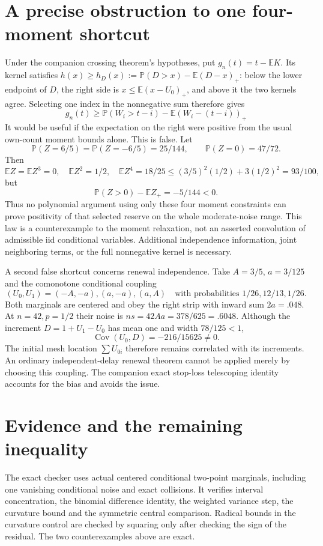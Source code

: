 \documentclass[11pt,a4paper]{article}
\newcommand{\E}{\mathbb E}\newcommand{\Pp}{\mathbb P}
\begin{document}
\section{A precise obstruction to one four-moment shortcut}
Under the companion crossing theorem's hypotheses, put
$g_n(t)=t-\E K$. Its kernel satisfies
$h(x)\ge h_D(x):=\Pp(D>x)-\E(D-x)_+$: below the lower endpoint of
$D$, the right side is $x\le\E(x-U_0)_+$, and above it the two
kernels agree. Selecting one index in the nonnegative sum therefore gives
\[
 g_n(t)\ge\Pp(W_i>t-i)-\E(W_i-(t-i))_+
\]
It would be useful if the expectation on the right
were positive from the usual own-count moment bounds alone. This is false.
Let
\[
 \Pp(Z=6/5)=\Pp(Z=-6/5)=25/144,
                 \qquad\Pp(Z=0)=47/72.
\]
Then
\[
 \E Z=\E Z^3=0,\quad \E Z^2=1/2,\quad\E Z^4=18/25
       \le(3/5)^2(1/2)+3(1/2)^2=93/100,
\]
but
\[
                   \Pp(Z>0)-\E Z_+=-5/144<0.
\]
Thus no polynomial argument using only these four moment constraints can
prove positivity of that selected reserve on the whole moderate-noise
range. This law is a counterexample to the moment relaxation, not an
asserted convolution of admissible iid conditional variables. Additional
independence information, joint neighboring terms, or the full nonnegative
kernel is necessary.

A second false shortcut concerns renewal independence. Take $A=3/5$,
$a=3/125$ and the comonotone conditional coupling
\[
 (U_0,U_1)=(-A,-a),(a,-a),(a,A)
       \quad\text{with probabilities }1/26,12/13,1/26.
\]
Both marginals are centered and obey the right strip with inward sum
$2a=.048$. At $n=42,p=1/2$ their noise is
$ns=42Aa=378/625=.6048$. Although the increment
$D=1+U_1-U_0$ has mean one and width $78/125<1$,
\[
                      \operatorname{Cov}(U_0,D)=-216/15625\ne0.
\]
The initial mesh location $\sum U_{0i}$ therefore remains correlated
with its increments. An ordinary independent-delay renewal theorem cannot
be applied merely by choosing this coupling. The companion exact
stop-loss telescoping identity accounts for the bias and avoids the issue.

\section{Evidence and the remaining inequality}
The exact checker uses actual centered conditional two-point marginals,
including one vanishing conditional noise and exact collisions. It verifies
interval concentration, the binomial difference identity, the weighted
variance step, the curvature bound and the symmetric central comparison.
Radical bounds in the curvature control are checked by squaring only after
checking the sign of the residual. The two counterexamples above are exact.
\end{document}
